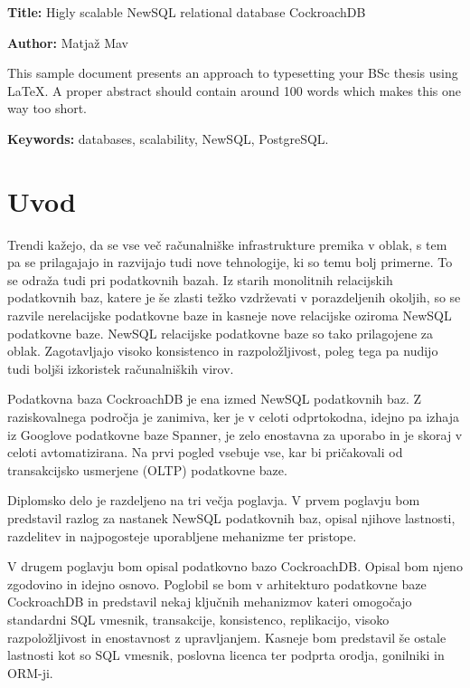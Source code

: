 \documentclass[a4paper, 12pt]{book}
\newcommand{\ttitleEn}{Higly scalable NewSQL relational database CockroachDB}
\newcommand{\tauthor}{Matjaž Mav}
\newcommand{\tkeywordsEn}{databases, scalability, NewSQL, PostgreSQL}
\newcommand{\clearemptydoublepage}{\newpage{\pagestyle{empty}\cleardoublepage}}
\begin{document}
\noindent\textbf{Title:} \ttitleEn
\bigskip

\noindent\textbf{Author:} \tauthor
\bigskip

\noindent This sample document presents an approach to typesetting your BSc thesis using \LaTeX. 
A proper abstract should contain around 100 words which makes this one way too short.
\bigskip

\noindent\textbf{Keywords:} \tkeywordsEn.
\clearemptydoublepage

\mainmatter
\setcounter{page}{1}
\pagestyle{fancy}


\chapter{Uvod}
Trendi kažejo, da se vse več računalniške infrastrukture premika v oblak, s tem pa se prilagajajo in razvijajo tudi nove tehnologije, ki so temu bolj primerne. To se odraža tudi pri podatkovnih bazah. Iz starih monolitnih relacijskih podatkovnih baz, katere je še zlasti težko vzdrževati v porazdeljenih okoljih, so se razvile nerelacijske podatkovne baze in kasneje nove relacijske oziroma NewSQL podatkovne baze. NewSQL relacijske podatkovne baze so tako prilagojene za oblak. Zagotavljajo visoko konsistenco in razpoložljivost, poleg tega pa nudijo tudi boljši izkoristek računalniških virov.

Podatkovna baza CockroachDB je ena izmed NewSQL podatkovnih baz. Z raziskovalnega področja je zanimiva, ker je v celoti odprtokodna, idejno pa izhaja iz Googlove podatkovne baze Spanner, je zelo enostavna za uporabo in je skoraj v celoti avtomatizirana. Na prvi pogled vsebuje vse, kar bi pričakovali od transakcijsko usmerjene (OLTP) podatkovne baze. 

Diplomsko delo je razdeljeno na tri večja poglavja. V prvem poglavju bom predstavil razlog za nastanek NewSQL podatkovnih baz, opisal njihove lastnosti, razdelitev in najpogosteje uporabljene mehanizme ter pristope.

V drugem poglavju bom opisal podatkovno bazo CockroachDB. Opisal bom njeno zgodovino in idejno osnovo. Poglobil se bom v arhitekturo podatkovne baze CockroachDB in predstavil nekaj ključnih mehanizmov kateri omogočajo standardni SQL vmesnik, transakcije, konsistenco, replikacijo, visoko razpoložljivost in enostavnost z upravljanjem. Kasneje bom predstavil še ostale lastnosti kot so SQL vmesnik, poslovna licenca ter podprta orodja, gonilniki in ORM-ji.
\end{document}
